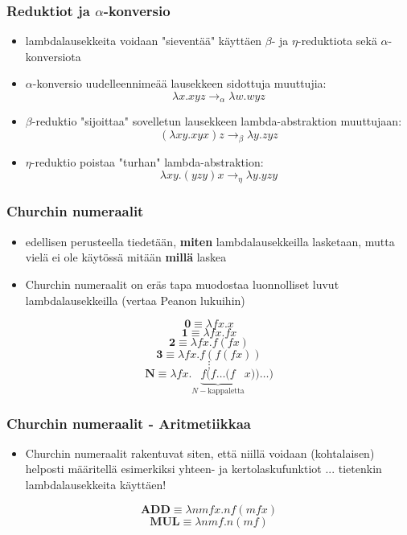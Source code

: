 \documentclass[12pt]{beamer}
\begin{document}
\begin{frame}
\frametitle{Reduktiot ja $\alpha$-konversio}
\begin{itemize}
\item lambdalausekkeita voidaan "sieventää" käyttäen $\beta$- ja $\eta$-reduktiota sekä $\alpha$-konversiota
\pause
\item $\alpha$-konversio uudelleennimeää lausekkeen sidottuja muuttujia:
\[ \lambda x . xyz  \rightarrow_{\alpha} \lambda w . wyz  \]
\pause
\item $\beta$-reduktio "sijoittaa" sovelletun lausekkeen lambda-abstraktion muuttujaan:
\[ (\lambda xy . xyx) z  \rightarrow_{\beta} \lambda y . zyz \]
\pause
\item $\eta$-reduktio poistaa "turhan" lambda-abstraktion:
\[ \lambda xy . (yzy) x \rightarrow_{\eta} \lambda y . yzy \]
\end{itemize}
\end{frame}

\begin{frame}
\frametitle{Churchin numeraalit}
\begin{itemize}
\item edellisen perusteella tiedetään, \textbf{miten} lambdalausekkeilla lasketaan, mutta vielä ei ole käytössä mitään \textbf{millä} laskea
\pause
\item Churchin numeraalit on eräs tapa muodostaa luonnolliset luvut lambdalausekkeilla (vertaa Peanon lukuihin)	 
\end{itemize}
\pause

\[ \textbf{0} \equiv \lambda fx . x \]
\[ \textbf{1} \equiv \lambda fx . fx \]
\[ \textbf{2} \equiv \lambda fx . f (fx) \] 
\[ \textbf{3} \equiv \lambda fx . f(f(fx)) \]
\[ \vdots \]
\[ \textbf{N} \equiv \lambda fx . \underbrace{ f ( f \ldots (f }_{ N-\text{kappaletta}} x)) \ldots ) \] 
\end{frame}

\begin{frame}
\frametitle{Churchin numeraalit - Aritmetiikkaa}
\begin{itemize}
\item Churchin numeraalit rakentuvat siten, että niillä voidaan (kohtalaisen) helposti määritellä esimerkiksi yhteen- ja kertolaskufunktiot \pause \alert{... tietenkin lambdalausekkeita käyttäen!}
\end{itemize}
\pause
\[ \textbf{ADD} \equiv \lambda nmfx . n f (m f x) \] 
\pause
\[ \textbf{MUL} \equiv \lambda n m f . n (mf) \]
\end{frame}
\end{document}
